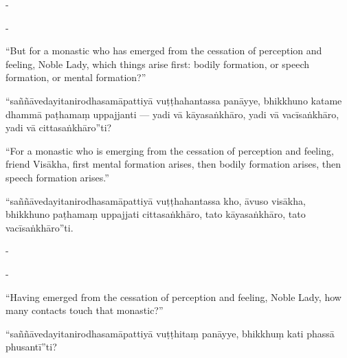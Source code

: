 \begin{samepage}
\begin{leftcolumn*}
-
\end{leftcolumn*}

\begin{rightcolumn}
-
\end{rightcolumn}
\end{samepage}

\begin{samepage}
\begin{leftcolumn*}
“But for a monastic who has emerged from the cessation of perception and feeling, Noble Lady, which things arise first: bodily formation, or speech formation, or mental formation?”
\end{leftcolumn*}

\begin{rightcolumn}
“saññāvedayitanirodhasamāpattiyā vuṭṭhahantassa panāyye, bhikkhuno katame dhammā paṭhamaṃ uppajjanti — yadi vā kāyasaṅkhāro, yadi vā vacīsaṅkhāro, yadi vā cittasaṅkhāro”ti?
\end{rightcolumn}
\end{samepage}

\begin{samepage}
\begin{leftcolumn*}
“For a monastic who is emerging from the cessation of perception and feeling, friend Visākha, first mental formation arises, then bodily formation arises, then speech formation arises.”
\end{leftcolumn*}

\begin{rightcolumn}
“saññāvedayitanirodhasamāpattiyā vuṭṭhahantassa kho, āvuso visākha, bhikkhuno paṭhamaṃ uppajjati cittasaṅkhāro, tato kāyasaṅkhāro, tato vacīsaṅkhāro”ti.
\end{rightcolumn}
\end{samepage}

\begin{samepage}
\begin{leftcolumn*}
-
\end{leftcolumn*}

\begin{rightcolumn}
-
\end{rightcolumn}
\end{samepage}

\begin{samepage}
\begin{leftcolumn*}
“Having emerged from the cessation of perception and feeling, Noble Lady, how many contacts touch that monastic?”
\end{leftcolumn*}

\begin{rightcolumn}
“saññāvedayitanirodhasamāpattiyā vuṭṭhitaṃ panāyye, bhikkhuṃ kati phassā phusantī”ti?
\end{rightcolumn}
\end{samepage}

